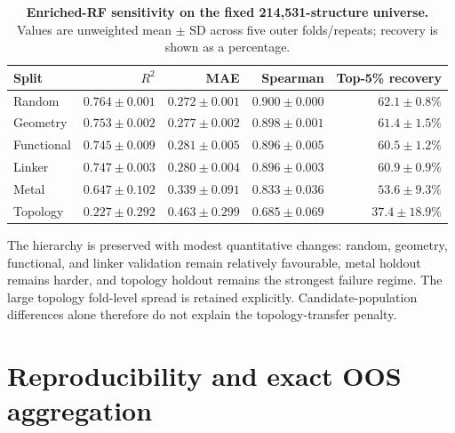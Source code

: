 \documentclass[11pt,a4paper]{article}
\begin{document}
\begin{table}[H]
\centering
\scriptsize
\caption{\textbf{Enriched-RF sensitivity on the fixed 214,531-structure universe.} Values are unweighted mean $\pm$ SD across five outer folds/repeats; recovery is shown as a percentage.}
\label{tab:fixed_universe}
\begin{tabular}{lrrrr}
\toprule
Split & $R^2$ & MAE & Spearman & Top-5\% recovery \\
\midrule
Random & $0.764\pm0.001$ & $0.272\pm0.001$ & $0.900\pm0.000$ & $62.1\pm0.8\%$ \\
Geometry & $0.753\pm0.002$ & $0.277\pm0.002$ & $0.898\pm0.001$ & $61.4\pm1.5\%$ \\
Functional & $0.745\pm0.009$ & $0.281\pm0.005$ & $0.896\pm0.005$ & $60.5\pm1.2\%$ \\
Linker & $0.747\pm0.003$ & $0.280\pm0.004$ & $0.896\pm0.003$ & $60.9\pm0.9\%$ \\
Metal & $0.647\pm0.102$ & $0.339\pm0.091$ & $0.833\pm0.036$ & $53.6\pm9.3\%$ \\
Topology & $0.227\pm0.292$ & $0.463\pm0.299$ & $0.685\pm0.069$ & $37.4\pm18.9\%$ \\
\bottomrule
\end{tabular}
\end{table}

The hierarchy is preserved with modest quantitative changes: random, geometry, functional, and linker validation remain relatively favourable, metal holdout remains harder, and topology holdout remains the strongest failure regime. The large topology fold-level spread is retained explicitly. Candidate-population differences alone therefore do not explain the topology-transfer penalty.

\section[Reproducibility and aggregation]{Reproducibility and exact OOS aggregation}
\end{document}
